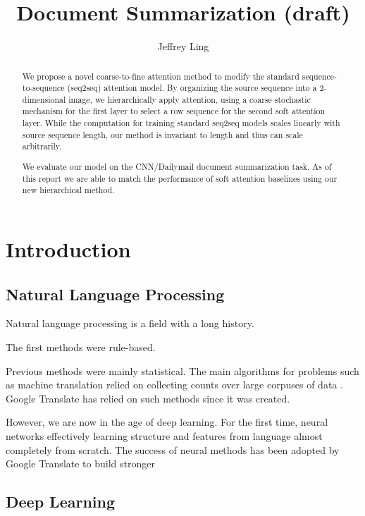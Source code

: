 \documentclass[11pt]{report}
\title{Document Summarization (draft)}
\author{Jeffrey Ling}
\begin{document}
\maketitle{}

\begin{abstract} %
We propose a novel coarse-to-fine attention method to modify the standard sequence-to-sequence (seq2seq) attention model. By organizing the source sequence into a 2-dimensional image, we hierarchically apply attention, using a coarse stochastic mechanism for the first layer to select a row sequence for the second soft attention layer. While the computation for training standard seq2seq models scales linearly with source sequence length, our method is invariant to length and thus can scale arbitrarily.

We evaluate our model on the CNN/Dailymail document summarization task. As of this report we are able to match the performance of soft attention baselines using our new hierarchical method.
\end{abstract}

\tableofcontents{}



\chapter{Introduction}


\section{Natural Language Processing}

Natural language processing is a field with a long history. 

The first methods were rule-based. %

Previous methods were mainly statistical. The main algorithms for problems such as machine translation  relied on collecting counts over large corpuses of data \citep{Brown1993}. Google Translate has relied on such methods since it was created.

However, we are now in the age of deep learning. For the first time, neural networks effectively learning structure and features from language almost completely from scratch. The success of neural methods has been adopted by Google Translate to build stronger 

\section{Deep Learning}
\end{document}
